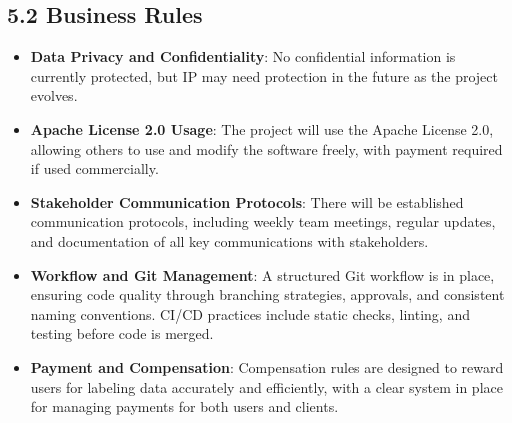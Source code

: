 \documentclass[12pt]{article}
\begin{document}
\subsection*{5.2 Business Rules}
\begin{itemize}
    \item \textbf{Data Privacy and Confidentiality}: No confidential information is currently protected, but IP may need protection in the future as the project evolves.
    \item \textbf{Apache License 2.0 Usage}: The project will use the Apache License 2.0, allowing others to use and modify the software freely, with payment required if used commercially.
    \item \textbf{Stakeholder Communication Protocols}: There will be established communication protocols, including weekly team meetings, regular updates, and documentation of all key communications with stakeholders.
    \item \textbf{Workflow and Git Management}: A structured Git workflow is in place, ensuring code quality through branching strategies, approvals, and consistent naming conventions. CI/CD practices include static checks, linting, and testing before code is merged.
    \item \textbf{Payment and Compensation}: Compensation rules are designed to reward users for labeling data accurately and efficiently, with a clear system in place for managing payments for both users and clients.
\end{itemize}
\end{document}
